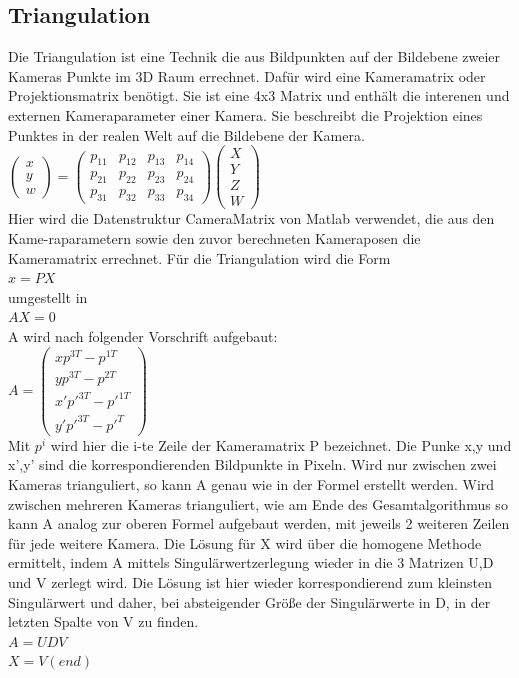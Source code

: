 \subsection{Triangulation}
\label{sec:Triangulation}
Die Triangulation ist eine Technik die aus Bildpunkten auf der Bildebene zweier Kameras Punkte im 3D Raum errechnet. Dafür wird eine Kameramatrix oder Projektionsmatrix benötigt. Sie ist eine 4x3 Matrix und enthält die interenen und externen Kameraparameter einer Kamera.  Sie beschreibt die Projektion eines Punktes in der realen Welt auf die Bildebene der Kamera.
\\
$ \begin{pmatrix} x\\y\\w \end{pmatrix} =  \begin{pmatrix} p_11 & p_12 & p_13 & p_14\\  p_21 & p_22 & p_23 & p_24 \\  p_31 & p_32 & p_33 & p_34  \end{pmatrix} \begin{pmatrix} X\\Y\\Z\\W \end{pmatrix}$
\\
Hier wird die Datenstruktur CameraMatrix von Matlab verwendet, die aus den Kame-raparametern sowie den zuvor berechneten Kameraposen die Kameramatrix errechnet.
Für die Triangulation wird die Form
\\
$x = PX$
\\
umgestellt in
\\
$AX = 0$
\\
A wird nach folgender Vorschrift aufgebaut:
\\
$A = \begin{pmatrix} xp^{3T} - p^{1T} \\ yp^{3T} - p^{2T} \\ x'p'^{3T} - p'^{1T} \\ y'p'^{3T} - p'^{T} \end{pmatrix}$
\\
Mit $p^i$ wird hier die i-te Zeile der Kameramatrix P bezeichnet. Die Punke x,y und x’,y’ sind die korrespondierenden Bildpunkte in Pixeln. Wird nur zwischen zwei Kameras trianguliert, so kann A genau wie in der Formel erstellt werden. Wird zwischen mehreren Kameras trianguliert, wie am Ende des Gesamtalgorithmus so kann A analog zur oberen Formel aufgebaut werden, mit jeweils 2 weiteren Zeilen für jede weitere Kamera.
Die Lösung für X wird über die homogene Methode ermittelt, indem A mittels Singulärwertzerlegung wieder in die 3 Matrizen U,D und V zerlegt wird. Die Lösung ist hier wieder korrespondierend zum kleinsten Singulärwert und daher, bei absteigender Größe der Singulärwerte in D,  in der letzten Spalte von V zu finden. \cite{Richard2000}
\\
$A = UDV$
\\
$X = V(end)$
\\

\clearpage

